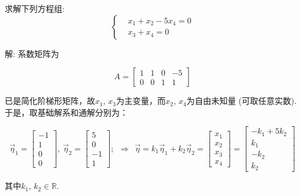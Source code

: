 \begin{eg}
求解下列方程组:
\begin{displaymath}\left\{\begin{aligned}
&x_1+x_2-5x_4=0\\
&x_3+x_4=0\end{aligned}\right.\end{displaymath}

解: 系数矩阵为

\begin{displaymath}A=\begin{bmatrix}1&1&0&-5\\0&0&1&1\end{bmatrix}\end{displaymath}

已是简化阶梯形矩阵，故$x_1$, $x_3$为主变量，而$x_2$, $x_4$为自由未知量 (可取任意实数). 于是，取基础解系和通解分别为：

\begin{displaymath}
\vec{\eta}_1=\begin{bmatrix}-1\\1\\0\\0\end{bmatrix},\ \vec{\eta}_2= \begin{bmatrix}5\\0\\-1\\1\end{bmatrix}; \ \ \Rightarrow \ \ \vec{\eta}=k_1\vec{\eta}_1+k_2\vec{\eta}_2=\begin{bmatrix}x_1\\x_2\\x_3\\x_4
\end{bmatrix}=\begin{bmatrix}-k_1+5k_2\\k_1\\-k_2\\k_2\end{bmatrix}\end{displaymath}

其中$k_1$, $k_2\in\mathbb{R}$.
\end{eg}

